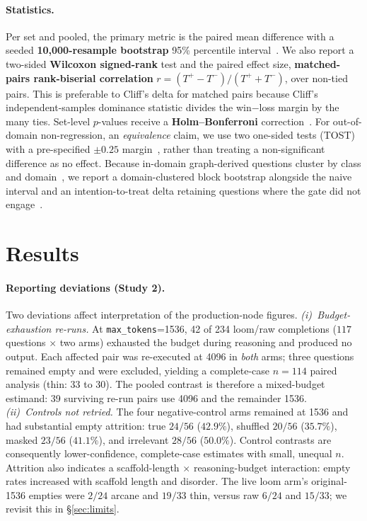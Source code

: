 \documentclass[10pt,twocolumn]{article}
\begin{document}
\paragraph{Statistics.} Per set and pooled, the primary metric is the paired mean difference with a seeded \textbf{10{,}000-resample bootstrap} 95\% percentile interval~\cite{efron1979bootstrap,koehn2004significance}. We also report a two-sided \textbf{Wilcoxon signed-rank} test and the paired effect size, \textbf{matched-pairs rank-biserial correlation} $r=(T^{+}-T^{-})/(T^{+}+T^{-})$, over non-tied pairs. This is preferable to Cliff's delta for matched pairs because Cliff's independent-samples dominance statistic divides the win$-$loss margin by the many ties. Set-level $p$-values receive a \textbf{Holm--Bonferroni} correction~\cite{dror2018hitchhiker}. For out-of-domain non-regression, an \emph{equivalence} claim, we use two one-sided tests (TOST) with a pre-specified $\pm0.25$ margin~\cite{lakens2017equivalence}, rather than treating a non-significant difference as no effect. Because in-domain graph-derived questions cluster by class and domain~\cite{dror2018hitchhiker}, we report a domain-clustered block bootstrap alongside the naive interval and an intention-to-treat delta retaining questions where the gate did not engage~\cite{hollis1999itt}.


\section{Results}\label{sec:results}
\paragraph{Reporting deviations (Study 2).} Two deviations affect interpretation of the production-node figures. \emph{(i)~Budget-exhaustion re-runs.} At \texttt{max\_tokens}=1536, 42 of 234 loom/raw completions ($117$ questions $\times$ two arms) exhausted the budget during reasoning and produced no output. Each affected pair was re-executed at 4096 in \emph{both} arms; three questions remained empty and were excluded, yielding a complete-case $n=114$ paired analysis (thin: 33 to 30). The pooled contrast is therefore a mixed-budget estimand: 39 surviving re-run pairs use 4096 and the remainder 1536. \emph{(ii)~Controls not retried.} The four negative-control arms remained at 1536 and had substantial empty attrition: true $24/56$ ($42.9\%$), shuffled $20/56$ ($35.7\%$), masked $23/56$ ($41.1\%$), and irrelevant $28/56$ ($50.0\%$). Control contrasts are consequently lower-confidence, complete-case estimates with small, unequal $n$. Attrition also indicates a scaffold-length $\times$ reasoning-budget interaction: empty rates increased with scaffold length and disorder. The live loom arm's original-1536 empties were $2/24$ arcane and $19/33$ thin, versus raw $6/24$ and $15/33$; we revisit this in \S\ref{sec:limits}.
\end{document}
